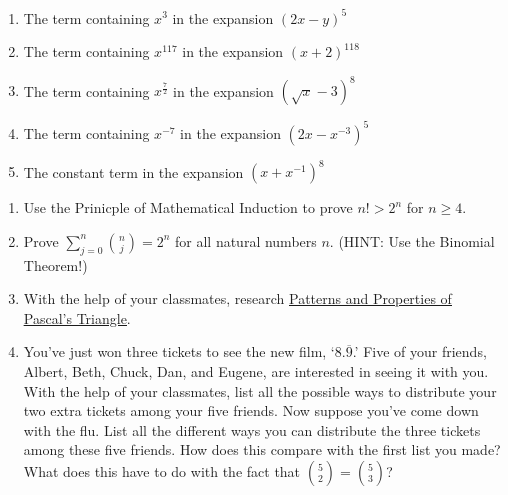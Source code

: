 \begin{enumerate}
\setcounter{enumi}{\value{HW}}

\item  The term containing $x^3$ in the expansion $(2x-y)^{5}$ \label{usebinomfirst}

\item  The term containing $x^{117}$ in the expansion $(x+2)^{118}$

\item  The term containing $x^{\frac{7}{2}}$ in the expansion $\left(\sqrt{x}-3\right)^8$

\item  The term containing $x^{-7}$ in the expansion  $\left(2x - x^{-3} \right)^{5}$

\item  The constant term in the expansion $\left(x + x^{-1} \right)^{8}$ \label{usenbinomlast}

\setcounter{HW}{\value{enumi}}
\end{enumerate}

\begin{enumerate}
\setcounter{enumi}{\value{HW}}

\item  Use the Prinicple of Mathematical Induction to prove $n! > 2^{n}$ for $n \geq	4$.

\item  Prove $\displaystyle{\sum_{j=0}^{n} \binom{n}{j} = 2^{n}}$ for all natural numbers $n$.  (HINT:  Use the Binomial Theorem!)

\item  With the help of your classmates, research \href{http://en.wikipedia.org/wiki/Pascal's_triangle#Patterns_and_properties}{\underline{Patterns and Properties of Pascal's Triangle}}.  

\item  You've just won three tickets to see the new film, `$8.\overline{9}$.'  Five of your friends, Albert, Beth, Chuck, Dan, and Eugene, are interested in seeing it with you.  With the help of your classmates, list all the possible ways to distribute your two extra tickets among your five friends.  Now suppose you've come down with the flu.  List all the different ways you can distribute the three tickets among these five friends.  How does this compare with the first list you made?  What does this have to do with the fact that $\binom{5}{2} = \binom{5}{3}$? 

\setcounter{HW}{\value{enumi}}
\end{enumerate}

